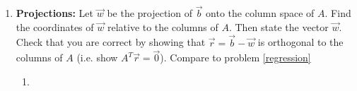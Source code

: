 \begin{enumerate}
\begin{enumerate}
\end{enumerate}



\item {\bf Projections:} \label{projections}Let $\vec w$ be the projection of $\vec b$ onto the column space of $A$.  Find the coordinates of $\vec w$ relative to the columns of $A$. Then state the vector $\vec w$. Check that you are correct by showing that $\vec r = \vec b-\vec w$ is orthogonal to the columns of $A$ (i.e. show $A^T\vec r=\vec 0$). Compare to problem \ref{regression}
\begin{enumerate}
\item 
{}
\end{enumerate}
\end{enumerate}
